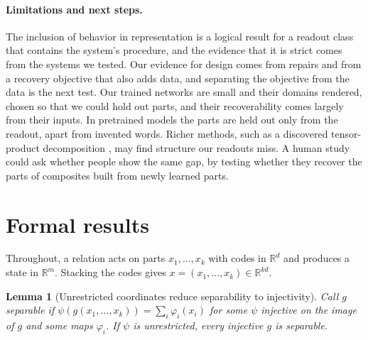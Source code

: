 \documentclass[10pt]{article}
\theoremstyle{plain}
\newtheorem{lemma}{Lemma}
\theoremstyle{remark}
\newcommand{\R}{\mathbb{R}}
\begin{document}
\paragraph{Limitations and next steps.} The inclusion of behavior in representation is a logical result for a readout class that contains the system's procedure, and the evidence that it is strict comes from the systems we tested. Our evidence for design comes from repairs and from a recovery objective that also adds data, and separating the objective from the data is the next test. Our trained networks are small and their domains rendered, chosen so that we could hold out parts, and their recoverability comes largely from their inputs. In pretrained models the parts are held out only from the readout, apart from invented words. Richer methods, such as a discovered tensor-product decomposition \citep{mccoy2019}, may find structure our readouts miss. A human study could ask whether people show the same gap, by testing whether they recover the parts of composites built from newly learned parts.

\FloatBarrier



\clearpage
\appendix
\makeatletter\let\@fb@secFB\relax\makeatother %

\section{Formal results}
\label{app:proofs}

Throughout, a relation acts on parts $x_1, \ldots, x_k$ with codes in $\R^d$ and produces a state in $\R^m$. Stacking the codes gives $x = (x_1, \ldots, x_k) \in \R^{kd}$.



\begin{lemma}[Unrestricted coordinates reduce separability to injectivity]
\label{lem:psi}
Call $g$ separable if $\psi(g(x_1, \ldots, x_k)) = \sum_i \varphi_i(x_i)$ for some $\psi$ injective on the image of $g$ and some maps $\varphi_i$. If $\psi$ is unrestricted, every injective $g$ is separable.
\end{lemma}
\end{document}
